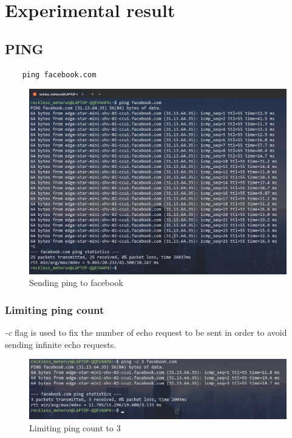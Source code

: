 \documentclass[11pt]{article}
\begin{document}
\section{Experimental result}

\subsection{PING}
\begin{verbatim}
	ping facebook.com
\end{verbatim}
\begin{figure}[H]
\centering
\includegraphics[width=\textwidth]{res/ping 1.png}
\caption{Sending ping to facebook}
\end{figure}

\subsubsection*{Limiting ping count}
\emph{-c} flag is used to fix the number of echo request to be sent in order to avoid sending infinite echo requests.
\begin{figure}[H]
\centering
\includegraphics[width=\textwidth]{res/ping 2.png}
\caption{Limiting ping count to 3}
\end{figure}
\end{document}
